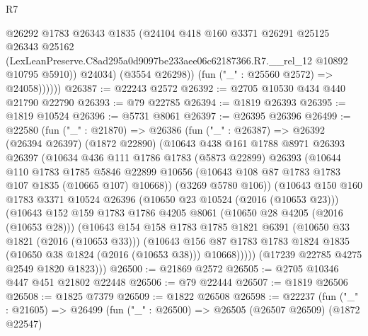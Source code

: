 \begin{lexlean}{R7}
\begin{coremodule}
                  @26292
                  @1783
                  @26343
                  @1835
                  (@24104
                    @418
                    @160
                    @3371
                    @26291
                    @25125
                    @26343
                    @25162
                    (LexLeanPreserve.C8ad295a0d9097be233aee06c62187366.R7.__rel_12
                      @10892
                      @10795
                      @5910))
                  @24034)
                (@3554 @26298))
              (fun ("_" : @25560 @2572) => @24058))))))
@26387 := @22243 @2572
@26392 := @2705 @10530 @434 @440 @21790 @22790
@26393 := @79 @22785
@26394 := @1819 @26393
@26395 := @1819 @10524
@26396 := @5731 @8061
@26397 := @26395 @26396
@26499 := @22580
    (fun ("_" : @21870) =>
    @26386
      (fun ("_" : @26387) =>
      @26392
        (@26394 @26397)
        (@1872 @22890)
        (@10643
          @438
          @161
          @1788
          @8971
          @26393
          @26397
          (@10634
            @436
            @111
            @1786
            @1783
            (@5873 @22899)
            @26393
            (@10644
              @110
              @1783
              @1785
              @5846
              @22899
              @10656
              (@10643 @108 @87 @1783 @1783 @107 @1835 (@10665 @107) @10668))
            (@3269 @5780 @106))
          (@10643
            @150
            @160
            @1783
            @3371
            @10524
            @26396
            (@10650 @23 @10524 (@2016 (@10653 @23)))
            (@10643
              @152
              @159
              @1783
              @1786
              @4205
              @8061
              (@10650 @28 @4205 (@2016 (@10653 @28)))
              (@10643
                @154
                @158
                @1783
                @1785
                @1821
                @6391
                (@10650 @33 @1821 (@2016 (@10653 @33)))
                (@10643
                  @156
                  @87
                  @1783
                  @1783
                  @1824
                  @1835
                  (@10650 @38 @1824 (@2016 (@10653 @38)))
                  @10668)))))
        (@17239 @22785 @4275 @2549 @1820 @1823)))
@26500 := @21869 @2572
@26505 := @2705 @10346 @447 @451 @21802 @22448
@26506 := @79 @22444
@26507 := @1819 @26506
@26508 := @1825 @7379
@26509 := @1822 @26508
@26598 := @22237
    (fun ("_" : @21605) =>
    @26499
      (fun ("_" : @26500) =>
      @26505
        (@26507 @26509)
        (@1872 @22547)

\end{coremodule}
\end{lexlean}

